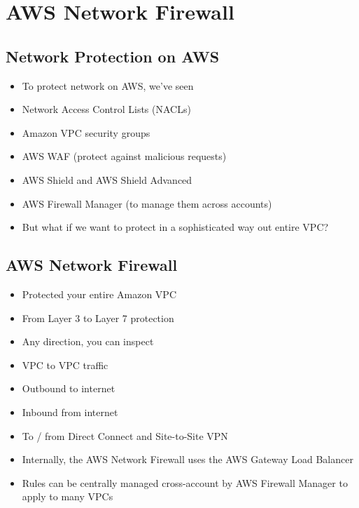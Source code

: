 \section{AWS Network Firewall}

\subsection{Network Protection on AWS}
\begin{itemize}
    \item To protect network on AWS, we've seen
    \item Network Access Control Lists (NACLs)
    \item Amazon VPC security groups
    \item AWS WAF (protect against malicious requests)
    \item AWS Shield and AWS Shield Advanced
    \item AWS Firewall Manager (to manage them across accounts)
    \item But what if we want to protect in a sophisticated way out entire VPC?
\end{itemize}

\subsection{AWS Network Firewall}
\begin{itemize}
    \item Protected your entire Amazon VPC
    \item From Layer 3 to Layer 7 protection
    \item Any direction, you can inspect
    \item VPC to VPC traffic
    \item Outbound to internet
    \item Inbound from internet
    \item To / from Direct Connect and Site-to-Site VPN
    \item Internally, the AWS Network Firewall uses the AWS Gateway Load Balancer
    \item Rules can be centrally managed cross-account by AWS Firewall Manager to apply to many VPCs
\end{itemize}

